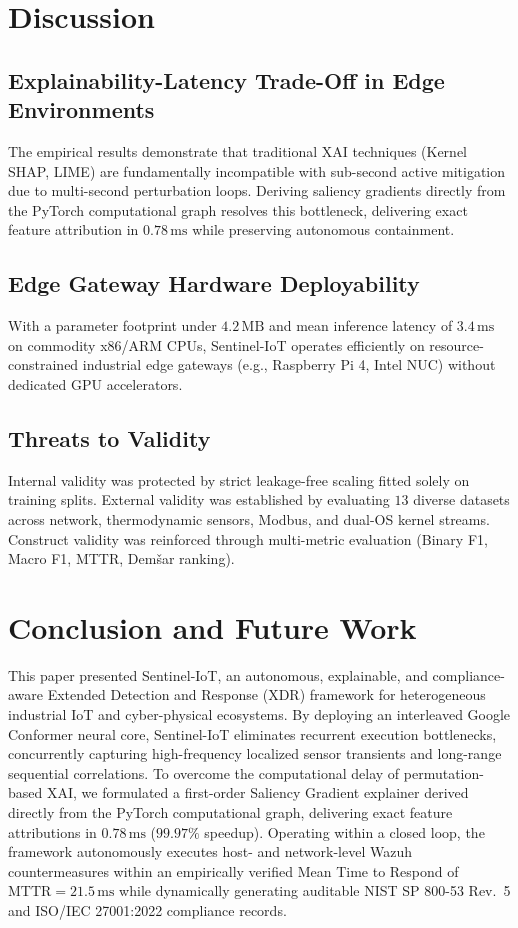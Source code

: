 \documentclass[11pt,a4paper]{article}
\begin{document}
\section{Discussion}
\label{sec:discussion}

\subsection{Explainability-Latency Trade-Off in Edge Environments}
The empirical results demonstrate that traditional XAI techniques (Kernel SHAP, LIME) are fundamentally incompatible with sub-second active mitigation due to multi-second perturbation loops. Deriving saliency gradients directly from the PyTorch computational graph resolves this bottleneck, delivering exact feature attribution in $0.78\,\text{ms}$ while preserving autonomous containment.

\subsection{Edge Gateway Hardware Deployability}
With a parameter footprint under $4.2\,\text{MB}$ and mean inference latency of $3.4\,\text{ms}$ on commodity x86/ARM CPUs, Sentinel-IoT operates efficiently on resource-constrained industrial edge gateways (e.g., Raspberry Pi 4, Intel NUC) without dedicated GPU accelerators.

\subsection{Threats to Validity}
Internal validity was protected by strict leakage-free scaling fitted solely on training splits. External validity was established by evaluating $13$ diverse datasets across network, thermodynamic sensors, Modbus, and dual-OS kernel streams. Construct validity was reinforced through multi-metric evaluation (Binary F1, Macro F1, MTTR, Demšar ranking).

\section{Conclusion and Future Work}
\label{sec:conclusion}

This paper presented Sentinel-IoT, an autonomous, explainable, and compliance-aware Extended Detection and Response (XDR) framework for heterogeneous industrial IoT and cyber-physical ecosystems. By deploying an interleaved Google Conformer neural core, Sentinel-IoT eliminates recurrent execution bottlenecks, concurrently capturing high-frequency localized sensor transients and long-range sequential correlations. To overcome the computational delay of permutation-based XAI, we formulated a first-order Saliency Gradient explainer derived directly from the PyTorch computational graph, delivering exact feature attributions in $0.78\,\text{ms}$ ($99.97\%$ speedup). Operating within a closed loop, the framework autonomously executes host- and network-level Wazuh countermeasures within an empirically verified Mean Time to Respond of $\text{MTTR} = 21.5\,\text{ms}$ while dynamically generating auditable NIST SP 800-53 Rev.~5 and ISO/IEC 27001:2022 compliance records.
\end{document}
